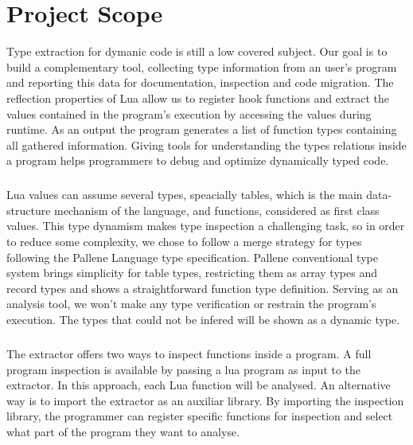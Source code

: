 
\chapter{Project Scope}
\label{cha:Project Scope}
Type extraction for dymanic code is still a low covered subject. Our goal is to build a complementary tool, collecting type information from an user's program and reporting this data for documentation, inspection and code migration. The reflection properties of Lua allow us to register hook functions and extract the values contained in the program's execution by accessing the values during runtime. As an output the program generates a list of function types containing all gathered information. Giving tools for understanding the types relations inside a program helps programmers to debug and optimize dynamically typed code.
\paragraph*{}
Lua values can assume several types, speacially tables, which is the main data-structure mechanism of the language, and functions, considered as first class values. This type dynamism makes type inspection a challenging task, so in order to reduce some complexity, we chose to follow a merge strategy for types following the Pallene Language type specification. Pallene conventional type system brings simplicity for table types, restricting them as array types and record types and shows a straightforward function type definition. Serving as an analysis tool, we won't make any type verification or restrain the program's execution. The types that could not be infered will be shown as a dynamic type.
\paragraph*{}
The extractor offers two ways to inspect functions inside a program. A full program inspection is available by passing a lua program as input to the extractor. In this approach, each Lua function will be analysed. An alternative way is to import the extractor as an auxiliar library. By importing the inspection library, the programmer can register specific functions for inspection and select what part of the program they want to analyse.



